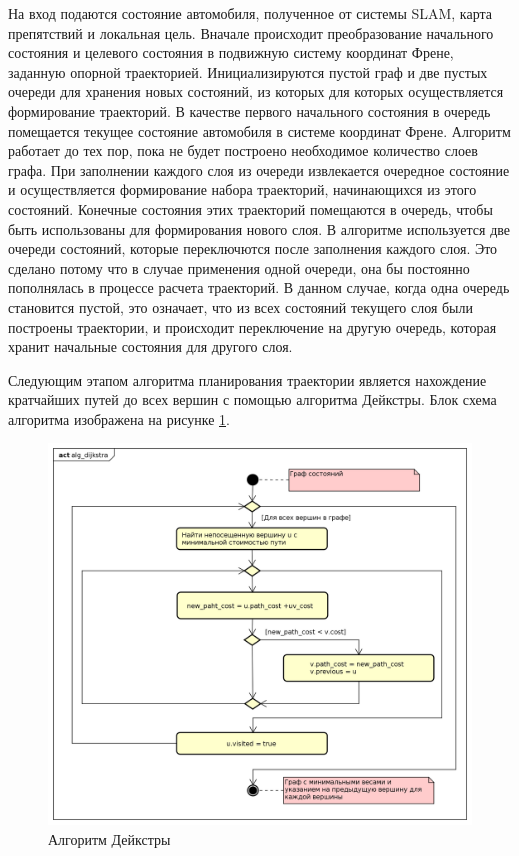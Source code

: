 На вход подаются состояние автомобиля, полученное от системы SLAM, карта препятствий и локальная цель. Вначале
происходит преобразование начального состояния и целевого состояния в подвижную систему координат Френе, заданную
опорной траекторией. Инициализируются пустой граф и две пустых очереди для хранения новых состояний, из которых
для которых осуществляется формирование траекторий. В качестве первого начального состояния в очередь помещается
текущее состояние автомобиля в системе координат Френе. Алгоритм работает до тех пор, пока не будет построено
необходимое количество слоев графа. При заполнении каждого слоя из очереди извлекается очередное состояние и
осуществляется формирование набора траекторий, начинающихся из этого состояний. Конечные состояния этих траекторий
помещаются в очередь, чтобы быть использованы для формирования нового слоя. В алгоритме используется две очереди
состояний, которые переключются после заполнения каждого слоя. Это сделано потому что в случае применения одной очереди,
она бы постоянно пополнялась в процессе расчета траекторий. В данном случае, когда одна очередь становится пустой, это
означает, что из всех состояний текущего слоя были построены траектории, и происходит переключение на другую очередь,
которая хранит начальные состояния для другого слоя.

Следующим этапом алгоритма планирования траектории является нахождение кратчайших путей до всех вершин с помощью
алгоритма Дейкстры. Блок схема алгоритма изображена на рисунке \ref{img:alg_dijkstra}.

\begin{figure}[h]
      \centering
      \includegraphics[width=\linewidth]{images/2_project/quintic_2/alg_dijkstra}
      \caption{Алгоритм Дейкстры}
      \label{img:alg_dijkstra}
\end{figure}

